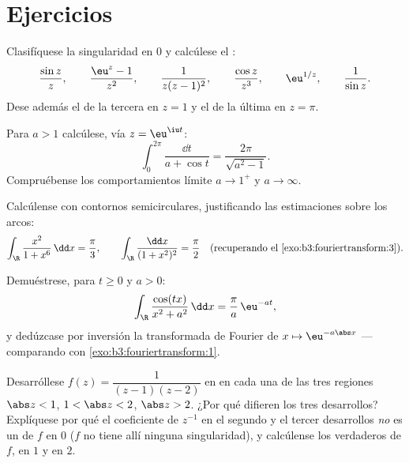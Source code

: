 \section{Ejercicios}

\begin{exercise}[$\star$]\label{exo:b3:residues:1}
Clasifíquese la singularidad en $0$ y calcúlese el
:
\[
\frac{\sin z}{z},\qquad
\frac{\eu^z - 1}{z^2},\qquad
\frac{1}{z(z-1)^2},\qquad
\frac{\cos z}{z^3},\qquad
\eu^{1/z},\qquad
\frac1{\sin z} .
\]
Dese además el  de la
tercera en $z = 1$ y el de la última en $z = \pi$.
\end{exercise}

\begin{exercise}[$\star$]\label{exo:b3:residues:2}
Para $a > 1$ calcúlese, vía $z = \eu^{\iu t}$:
\[
\int_0^{2\pi}\frac{\dd t}{a + \cos t}
= \frac{2\pi}{\sqrt{a^2 - 1}} .
\]
Compruébense los comportamientos límite $a \to 1^+$ y $a \to \infty$.
\end{exercise}

\begin{exercise}[$\star\star$]\label{exo:b3:residues:3}
Calcúlense con contornos semicirculares, justificando las estimaciones
sobre los arcos:
\[
\int_\R\frac{x^2}{1 + x^6}\,\dd x = \frac\pi3,
\qquad
\int_\R\frac{\dd x}{(1 + x^2)^{2}} = \frac\pi2
\quad\text{(recuperando el \cref{exo:b3:fouriertransform:3})}.
\]
\end{exercise}

\begin{exercise}[$\star\star$]\label{exo:b3:residues:4}
Demuéstrese, para $t \geq 0$ y $a > 0$:
\[
\int_\R\frac{\cos(tx)}{x^2 + a^2}\,\dd x =
\frac{\pi}{a}\,\eu^{-at},
\]
y dedúzcase por inversión la transformada de Fourier de
$x \mapsto \eu^{-a\abs
x}$ --- comparando con
\cref{exo:b3:fouriertransform:1}.
\end{exercise}

\begin{exercise}[$\star\star$]\label{exo:b3:residues:5}
Desarróllese $f(z) = \dfrac1{(z-1)(z-2)}$ en
 en cada una de las
tres regiones $\abs z < 1$, $1 < \abs z < 2$, $\abs z >
2$. ¿Por qué difieren los tres desarrollos? Explíquese por qué el
coeficiente de $z^{-1}$ en el segundo y el tercer desarrollos \emph{no}
es un  de $f$ en $0$ ($f$
no tiene allí ninguna singularidad), y calcúlense los
 verdaderos de $f$, en
$1$ y en
$2$.
\end{exercise}

